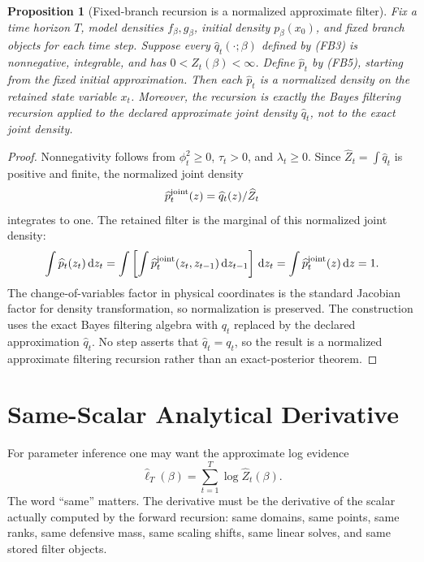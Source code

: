 \documentclass[11pt]{article}
\newtheorem{proposition}{Proposition}
\newcommand{\dd}{\,\mathrm d}
\begin{document}
\begin{proposition}[Fixed-branch recursion is a normalized approximate filter]
Fix a time horizon \(T\), model densities \(f_\beta,g_\beta\), initial density
\(p_\beta(x_0)\), and fixed branch objects for each time step.  Suppose every
\(\widehat q_t(\cdot;\beta)\) defined by (FB3) is nonnegative, integrable, and
has \(0<\widehat Z_t(\beta)<\infty\).  Define \(\widehat p_t\) by (FB5),
starting from the fixed initial approximation.  Then each \(\widehat p_t\) is a
normalized density on the retained state variable \(x_t\).  Moreover, the
recursion is exactly the Bayes filtering recursion applied to the declared
approximate joint density \(\widehat q_t\), not to the exact joint density.
\end{proposition}

\begin{proof}
Nonnegativity follows from
\(\phi_t^2\ge0\), \(\tau_t>0\), and \(\lambda_t\ge0\).  Since
\(\widehat Z_t=\int\widehat q_t\) is positive and finite, the normalized joint
density
\[
    \widehat p_t^{\rm joint}(z)
    =
    \widehat q_t(z)/\widehat Z_t
\]
integrates to one.  The retained filter is the marginal of this normalized
joint density:
\[
    \int \widehat p_t(z_t)\dd z_t
    =
    \int
    \left[
    \int \widehat p_t^{\rm joint}(z_t,z_{t-1})\dd z_{t-1}
    \right]\dd z_t
    =
    \int \widehat p_t^{\rm joint}(z)\dd z
    =
    1.
\]
The change-of-variables factor in physical coordinates is the standard
Jacobian factor for density transformation, so normalization is preserved.  The
construction uses the exact Bayes filtering algebra with \(q_t\) replaced by
the declared approximation \(\widehat q_t\).  No step asserts that
\(\widehat q_t=q_t\), so the result is a normalized approximate filtering
recursion rather than an exact-posterior theorem.
\end{proof}

\section{Same-Scalar Analytical Derivative}

For parameter inference one may want the approximate log evidence
\[
    \widehat\ell_T(\beta)
    =
    \sum_{t=1}^T \log \widehat Z_t(\beta).
    \tag{G1}
\]
The word ``same'' matters.  The derivative must be the derivative of the scalar
actually computed by the forward recursion: same domains, same points, same
ranks, same defensive mass, same scaling shifts, same linear solves, and same
stored filter objects.
\end{document}
